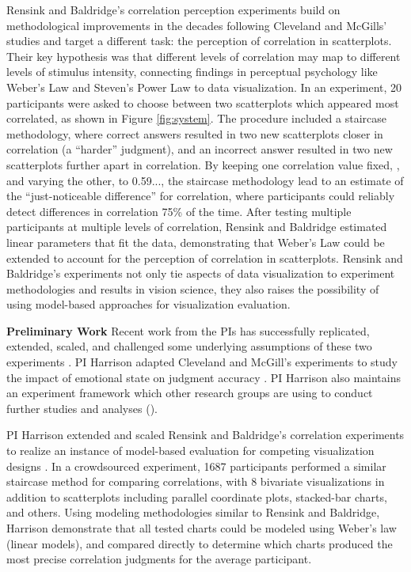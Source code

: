 \documentclass[11pt]{article}
\begin{document}
Rensink and Baldridge's correlation perception experiments \cite{rensink2010perception} build on methodological improvements in the decades following Cleveland and McGills' studies and target a different task: the perception of correlation in scatterplots.
Their key hypothesis was that different levels of correlation may map to different levels of stimulus intensity, connecting findings in perceptual psychology like Weber's Law and Steven's Power Law \cite{stevens1957psychophysical} to data visualization.
In an experiment, 20 participants were asked to choose between two scatterplots which appeared most correlated, as shown in Figure \ref{fig:system}.
The procedure included a staircase methodology, where correct answers resulted in two new scatterplots closer in correlation (\eg a ``harder'' judgment), and an incorrect answer resulted in two new scatterplots further apart in correlation.
By keeping one correlation value fixed, , and varying the other,  to 0.59..., the staircase methodology lead to an estimate of the ``just-noticeable difference'' for correlation, where participants could reliably detect differences in correlation 75\% of the time.
After testing multiple participants at multiple levels of correlation, Rensink and Baldridge estimated linear parameters that fit the data, demonstrating that Weber's Law could be extended to account for the perception of correlation in scatterplots.
Rensink and Baldridge's experiments not only tie aspects of data visualization to experiment methodologies and results in vision science, they also raises the possibility of using model-based approaches for visualization evaluation.

\noindent\textbf{Preliminary Work}
Recent work from the PIs has successfully replicated, extended, scaled, and challenged some underlying assumptions of these two experiments \cite{harrison2013influencing, harrison2014ranking, kay2016beyond}.
PI Harrison adapted Cleveland and McGill's experiments to study the impact of emotional state on judgment accuracy \cite{harrison2013influencing}.
PI Harrison also maintains an experiment framework \cite{experimentr} which other research groups are using to conduct further studies and analyses (\eg \cite{skau2015evaluation, skau2016arcs, skau2016judgment}).

PI Harrison extended and scaled Rensink and Baldridge's correlation experiments to realize an instance of model-based evaluation for competing visualization designs \cite{harrison2014ranking}.
In a crowdsourced experiment, 1687 participants performed a similar staircase method for comparing correlations, with 8 bivariate visualizations in addition to scatterplots including parallel coordinate plots, stacked-bar charts, and others.
Using modeling methodologies similar to Rensink and Baldridge, Harrison \etal demonstrate that all tested charts could be modeled using Weber's law (\ie linear models), and compared directly to determine which charts produced the most precise correlation judgments for the average participant.
\end{document}
